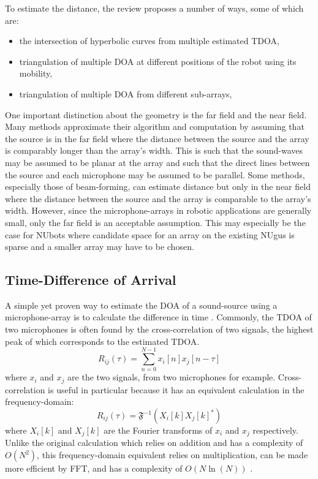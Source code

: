 \documentclass{report}
\begin{document}
To estimate the distance, the review proposes a number of ways, some of which are:
\begin{itemize}
	\item the intersection of hyperbolic curves from multiple estimated TDOA,
	\item triangulation of multiple DOA at different positions of the robot using its mobility,
	\item triangulation of multiple DOA from different sub-arrays,
\end{itemize}

One important distinction about the geometry is the far field and the near field. Many methods approximate their algorithm and computation by assuming that the source is in the far field where the distance between the source and the array is comparably longer than the array's width. This is such that the sound-waves may be assumed to be planar at the array and such that the direct lines between the source and each microphone may be assumed to be parallel. Some methods, especially those of beam-forming, can estimate distance but only in the near field where the distance between the source and the array is comparable to the array's width. However, since the microphone-arrays in robotic applications are generally small, only the far field is an acceptable assumption. This may especially be the case for NUbots where candidate space for an array on the existing NUgus is sparse and a smaller array may have to be chosen.

\subsection{Time-Difference of Arrival}

A simple yet proven way to estimate the DOA of a sound-source using a microphone-array is to calculate the difference in time \cite{argentieri_survey_2015}. Commonly, the TDOA of two microphones is often found by the cross-correlation of two signals, the highest peak of which corresponds to the estimated TDOA. 
\begin{equation}
R_{ij}(\tau) = \sum_{n=0}^{N-1} x_i[n]x_j[n-\tau]
\end{equation}
where $x_i$ and $x_j$ are the two signals, from two microphones for example. Cross-correlation is useful in particular because it has an equivalent calculation in the frequency-domain:
\begin{equation}
R_{ij}(\tau) = \mathfrak{F}^{-1} \left( X_i[k]X_j[k]^* \right)
\end{equation}
where $X_i[k]$ and $X_j[k]$ are the Fourier transforms of $x_i$ and $x_j$ respectively. Unlike the original calculation which relies on addition and has a complexity of $O(N^2)$, this frequency-domain equivalent relies on multiplication, can be made more efficient by FFT, and has a complexity of $O\left(N\ln(N)\right)$ \cite{valin_robust_2003}.
\end{document}
